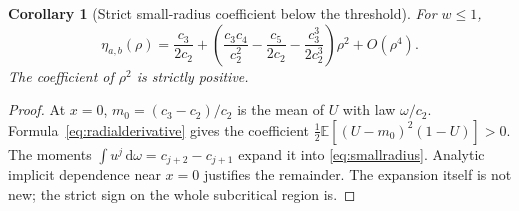 \documentclass[11pt]{article}
\numberwithin{equation}{section}
\newtheorem{corollary}[theorem]{Corollary}
\theoremstyle{definition}
\theoremstyle{remark}
\newcommand{\dd}{\,\mathrm d}
\newcommand{\E}{\mathbb E}
\begin{document}
\begin{corollary}[Strict small-radius coefficient below the threshold]
\label{cor:smallradius}
For $w\le1$,
\begin{equation}\label{eq:smallradius}
 \eta_{a,b}(\rho)=\frac{c_3}{2c_2}
 +\left(\frac{c_3c_4}{c_2^2}-\frac{c_5}{2c_2}
                    -\frac{c_3^3}{2c_2^3}\right)\rho^2+O(\rho^4).
\end{equation}
The coefficient of $\rho^2$ is strictly positive.
\end{corollary}
\begin{proof}
At $x=0$, $m_0=(c_3-c_2)/c_2$ is the mean of $U$ with law
$\omega/c_2$. Formula~\eqref{eq:radialderivative} gives the coefficient
$\tfrac12\E[(U-m_0)^2(1-U)]>0$.
The moments $\int u^j\dd\omega=c_{j+2}-c_{j+1}$ expand it into
\eqref{eq:smallradius}. Analytic implicit dependence near $x=0$
justifies the remainder. The expansion itself is not new; the strict
sign on the whole subcritical region is.
\end{proof}
\end{document}
